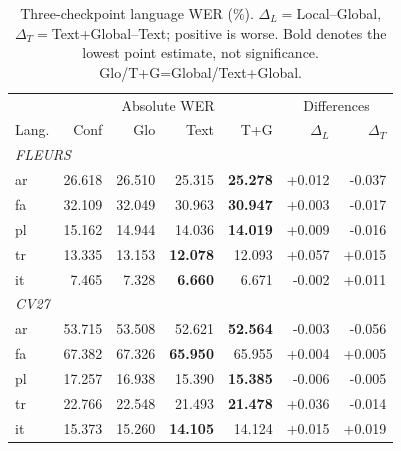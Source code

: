 \begin{table}[t]\centering\setlength{\tabcolsep}{2pt}
\caption{Three-checkpoint language WER (\%). $\Delta_L=$Local--Global, $\Delta_T=$Text+Global--Text; positive is worse. Bold denotes the lowest point estimate, not significance. Glo/T+G=Global/Text+Global.}\label{tab:languages}
\begin{tabular}{lrrrrrr}\toprule
 & \multicolumn{4}{c}{Absolute WER} & \multicolumn{2}{c}{Differences} \\
Lang. & Conf & Glo & Text & T+G & $\Delta_L$ & $\Delta_T$ \\\midrule
\multicolumn{7}{l}{\textit{FLEURS}}\\
ar & 26.618 & 26.510 & 25.315 & \textbf{25.278} & +0.012 & -0.037 \\
fa & 32.109 & 32.049 & 30.963 & \textbf{30.947} & +0.003 & -0.017 \\
pl & 15.162 & 14.944 & 14.036 & \textbf{14.019} & +0.009 & -0.016 \\
tr & 13.335 & 13.153 & \textbf{12.078} & 12.093 & +0.057 & +0.015 \\
it & 7.465 & 7.328 & \textbf{6.660} & 6.671 & -0.002 & +0.011 \\
\midrule
\multicolumn{7}{l}{\textit{CV27}}\\
ar & 53.715 & 53.508 & 52.621 & \textbf{52.564} & -0.003 & -0.056 \\
fa & 67.382 & 67.326 & \textbf{65.950} & 65.955 & +0.004 & +0.005 \\
pl & 17.257 & 16.938 & 15.390 & \textbf{15.385} & -0.006 & -0.005 \\
tr & 22.766 & 22.548 & 21.493 & \textbf{21.478} & +0.036 & -0.014 \\
it & 15.373 & 15.260 & \textbf{14.105} & 14.124 & +0.015 & +0.019 \\
\bottomrule\end{tabular}\end{table}
